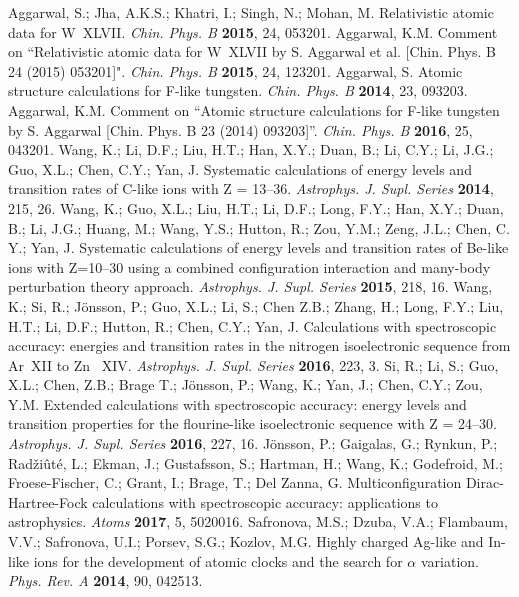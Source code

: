 \documentclass[fleqn]{article}
\begin{document}
\begin{thebibliography}{999}
 Aggarwal, S.; Jha, A.K.S.; Khatri, I.; Singh, N.; Mohan, M.  Relativistic atomic data for W~XLVII.  {\em Chin. Phys. B} {\bf 2015}, 24, 053201.
 Aggarwal, K.M. Comment on ``Relativistic atomic data for W~XLVII by S. Aggarwal et al. [Chin. Phys. B 24 (2015) 053201]".  {\em Chin. Phys. B} {\bf 2015}, 24, 123201.
 Aggarwal, S. Atomic structure calculations for F-like tungsten. {\em Chin. Phys. B} {\bf 2014}, 23, 093203.
 Aggarwal, K.M. Comment on ``Atomic structure calculations for F-like tungsten by S. Aggarwal [Chin. Phys. B  23 (2014) 093203]''. {\em Chin. Phys. B} {\bf 2016}, 25, 043201.
 Wang, K.;  Li, D.F.; Liu, H.T.; Han, X.Y.;  Duan, B.; Li, C.Y.; Li, J.G.; Guo,  X.L.; Chen, C.Y.;  Yan, J.  Systematic calculations of energy levels and transition rates of C-like ions with Z = 13--36. { \em Astrophys. J. Supl. Series} {\bf 2014}, 215, 26. 
 Wang, K.;  Guo,  X.L.; Liu, H.T.; Li, D.F.;  Long, F.Y.; Han, X.Y.;  Duan, B.;  Li, J.G.; Huang, M.; Wang, Y.S.; Hutton, R.; Zou, Y.M.; Zeng, J.L.; Chen, C. Y.;  Yan, J.
Systematic calculations of energy levels and transition rates of Be-like ions with Z=10--30 using a combined configuration interaction and many-body perturbation theory approach. { \em Astrophys. J. Supl. Series} {\bf 2015}, 218, 16. 
 Wang, K.; Si, R.; J\"{o}nsson, P.; Guo, X.L.; Li, S.; Chen Z.B.; Zhang, H.; Long, F.Y.; Liu, H.T.; Li, D.F.; Hutton, R.;  Chen, C.Y.;  Yan, J. Calculations with spectroscopic accuracy: energies and transition rates in the nitrogen isoelectronic sequence from Ar~XII to Zn ~XIV.  {\em Astrophys. J. Supl. Series} {\bf 2016}, 223, 3.
 Si, R.; Li, S.;  Guo, X.L.; Chen, Z.B.;  Brage T.;  J\"{o}nsson, P.;  Wang, K.; Yan, J.; Chen, C.Y.; Zou, Y.M.  Extended calculations with spectroscopic accuracy: energy levels and transition properties for the flourine-like isoelectronic  sequence with Z = 24--30. {\em Astrophys. J. Supl. Series} {\bf 2016}, 227, 16. 
  J\"{o}nsson, P.;  Gaigalas, G.;  Rynkun, P.;  Rad\v{z}i\^{u}t\'{e}, L.;   Ekman, J.;   Gustafsson, S.;  Hartman, H.;   Wang, K.; Godefroid, M.;  Froese-Fischer, C.;  Grant, I.; Brage, T.;   Del Zanna, G. Multiconfiguration Dirac-Hartree-Fock calculations with spectroscopic accuracy: applications to astrophysics.  {\em Atoms} {\bf 2017}, 5, 5020016.
 Safronova, M.S.;  Dzuba, V.A.; Flambaum, V.V.;  Safronova, U.I.; Porsev, S.G.;   Kozlov, M.G. Highly charged Ag-like and In-like ions for the development of atomic clocks and the search for $\alpha$ variation.  {\em Phys. Rev. A} {\bf 2014},   90, 042513.

\end{thebibliography}
\end{document}
